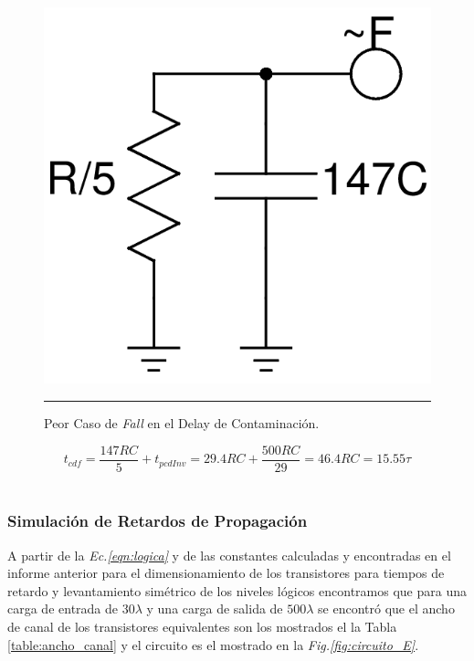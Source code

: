 \documentclass[12pt,a4paper]{article} %
\begin{document}
\begin{figure}[htbp]
  \centering
    \includegraphics[scale=0.25]{./Peor_Caso_Fall_contam.png}
    \rule{35em}{0.3pt}
  \caption[C_Carga]{Peor Caso de \textit{Fall} en el Delay de Contaminación.}
  \label{fig:Peor_Caso_Fall_contam}
\end{figure}

\begin{equation}\label{eqn:DelayC_Fall_Peor}
t_{cdf} = \frac{147RC}{5}+t_{pcdInv}=29.4RC+\frac{500RC}{29}=46.4RC=15.55\tau
\end{equation}\\


\subsubsection{Simulación de Retardos de Propagación}

A partir de la \textit{Ec.\ref{eqn:logica}} y de las constantes calculadas y encontradas en el informe anterior para el dimensionamiento de los transistores para tiempos de retardo y levantamiento simétrico de los niveles lógicos encontramos que para una carga de entrada de $30\lambda$ y una carga de salida de $500\lambda$ se encontró que el ancho de canal de los transistores equivalentes son los mostrados el la Tabla \ref{table:ancho_canal} y el circuito es el mostrado en la \textit{Fig.\ref{fig:circuito_E}}.\\
\end{document}
